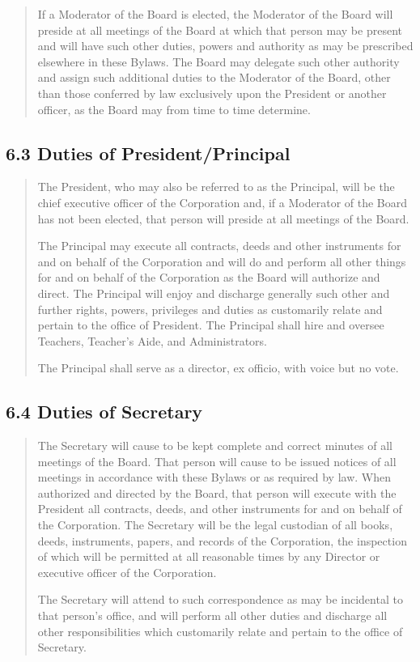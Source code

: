 \documentclass[
]{book}
\begin{document}
\begin{quote}
If a Moderator of the Board is elected, the Moderator of the Board
will preside at all meetings of the Board at which that person may be
present and will have such other duties, powers and authority as may
be prescribed elsewhere in these Bylaws. The Board may delegate such
other authority and assign such additional duties to the Moderator of
the Board, other than those conferred by law exclusively upon the
President or another officer, as the Board may from time to time
determine.
\end{quote}

\subsection{6.3 Duties of President/Principal}\label{duties-of-presidentprincipal}

\begin{quote}
The President, who may also be referred to as the Principal, will be
the chief executive officer of the Corporation and, if a Moderator of
the Board has not been elected, that person will preside at all
meetings of the Board.

The Principal may execute all contracts, deeds and other instruments
for and on behalf of the Corporation and will do and perform all other
things for and on behalf of the Corporation as the Board will
authorize and direct. The Principal will enjoy and discharge generally
such other and further rights, powers, privileges and duties as
customarily relate and pertain to the office of President. The
Principal shall hire and oversee Teachers, Teacher's Aide, and
Administrators.

The Principal shall serve as a director, ex officio, with voice but no
vote.
\end{quote}

\subsection{6.4 Duties of Secretary}\label{duties-of-secretary}

\begin{quote}
The Secretary will cause to be kept complete and correct minutes of
all meetings of the Board. That person will cause to be issued notices
of all meetings in accordance with these Bylaws or as required by law.
When authorized and directed by the Board, that person will execute
with the President all contracts, deeds, and other instruments for and
on behalf of the Corporation. The Secretary will be the legal
custodian of all books, deeds, instruments, papers, and records of the
Corporation, the inspection of which will be permitted at all
reasonable times by any Director or executive officer of the
Corporation.

The Secretary will attend to such correspondence as may be incidental
to that person's office, and will perform all other duties and
discharge all other responsibilities which customarily relate and
pertain to the office of Secretary.
\end{quote}
\end{document}
